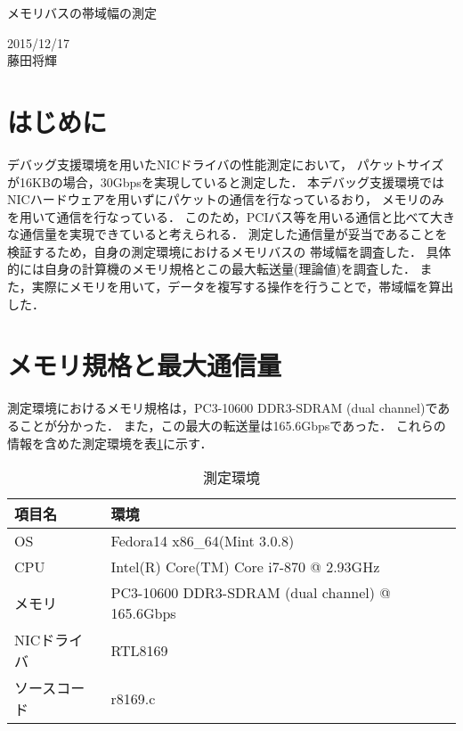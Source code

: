 \documentclass[12pt]{jsarticle}
\begin{document}

\begin{center}
    {\LARGE メモリバスの帯域幅の測定}
\end{center}

\begin{flushright}
    2015/12/17\\
    藤田将輝
\end{flushright}
\section{はじめに}

デバッグ支援環境を用いたNICドライバの性能測定において，
パケットサイズが16KBの場合，30Gbpsを実現していると測定した．
本デバッグ支援環境ではNICハードウェアを用いずにパケットの通信を行なっているおり，
メモリのみを用いて通信を行なっている．
このため，PCIバス等を用いる通信と比べて大きな通信量を実現できていると考えられる．
測定した通信量が妥当であることを検証するため，自身の測定環境におけるメモリバスの
帯域幅を調査した．
具体的には自身の計算機のメモリ規格とこの最大転送量(理論値)を調査した．
また，実際にメモリを用いて，データを複写する操作を行うことで，帯域幅を算出した．

\section{メモリ規格と最大通信量}
測定環境におけるメモリ規格は，PC3-10600 DDR3-SDRAM (dual channel)であることが分かった．
また，この最大の転送量は165.6Gbpsであった．
これらの情報を含めた測定環境を表\ref{kankyou}に示す．

\begin{table}[h]
    \caption{測定環境}
    \label{kankyou}
    \begin{center}
        \begin{tabular}{l|l}   \hline \hline 
            項目名      & 環境    \\ \hline
            OS          & Fedora14 x86\_64(Mint 3.0.8)  \\ 
            CPU         & Intel(R) Core(TM) Core i7-870 @ 2.93GHz \\ 
            メモリ      & PC3-10600 DDR3-SDRAM (dual channel) @ 165.6Gbps \\
            NICドライバ & RTL8169    \\ 
            ソースコード& r8169.c \\ \hline
        \end{tabular}
    \end{center}
\end{table}
\end{document}
